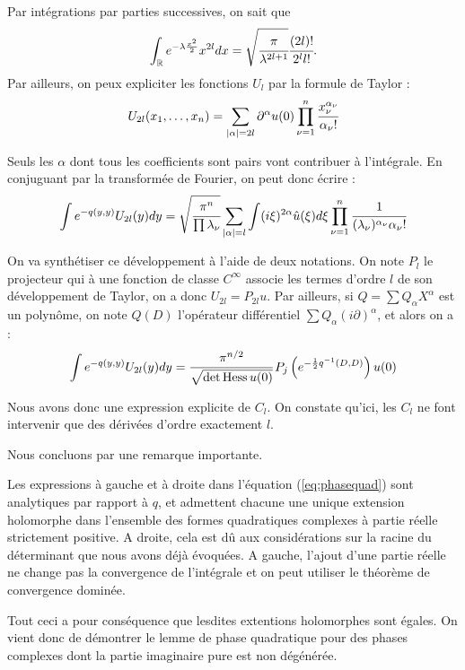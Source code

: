 Par intégrations par parties successives, on sait que 
\begin{equation*}
  \int_{\mathbb{R}} e^{-\lambda \frac{x^2}{2}}x^{2l}dx = \sqrt{\cfrac{\pi}{\lambda^{2l+1}}}\cfrac{(2l)!}{2^l l!}.
\end{equation*}
\noindent Par ailleurs, on peux expliciter les fonctions $U_l$ par la formule de Taylor :
\begin{equation*}
  U_{2l}(x_1,\ldots,x_n) = \sum_{|\alpha|=2l}\partial^{\alpha}u(0)\prod_{\nu=1}^{n}\cfrac{x_{\nu}^{\alpha_{\nu}}}{\alpha_{\nu}!}
\end{equation*}

Seuls les $\alpha$ dont tous les coefficients sont pairs vont contribuer à l'intégrale. En conjuguant par la transformée de Fourier, on peut donc écrire :
\begin{equation*}
  \int e^{-q(y,y)}U_{2l}(y)dy = \sqrt{\cfrac{\pi^n}{\prod \lambda_{\nu}}}\sum_{|\alpha|=l}\int (i\xi)^{2\alpha}\hat{u}(\xi)d\xi \prod_{\nu=1}^{n} \cfrac{1}{(\lambda_{\nu})^{\alpha_{\nu}}\alpha_{\nu}!}
  \end{equation*}
  
On va synthétiser ce développement à l'aide de deux notations. On note $P_l$ le projecteur qui à une fonction de classe $C^{\infty}$ associe les termes d'ordre $l$ de son développement de Taylor, on a donc $U_{2l}=P_{2l}u$. Par ailleurs, si $Q= \sum Q_{\alpha}X^{\alpha}$ est un polynôme, on note $Q(D)$ l'opérateur différentiel $\sum Q_{\alpha}(i\partial)^\alpha$, et alors on a :
\begin{equation*}
\label{eq:phasequad}
  \int e^{-q(y,y)}U_{2l}(y)dy =\cfrac{\pi^{n/2}}{\sqrt{\det \operatorname{Hess} u(0)}}\,P_j\left(e^{-\frac{1}{2}q^{-1}(D,D)}\right)u(0)
  \end{equation*}

\noindent Nous avons donc une expression explicite de $C_l$. On constate qu'ici, les $C_l$ ne font intervenir que des dérivées d'ordre exactement $l$.

Nous concluons par une remarque importante.

\begin{rem}
Les expressions à gauche et à droite dans l'équation (\ref{eq:phasequad}) sont analytiques par rapport à $q$, et admettent chacune une unique extension holomorphe dans l'ensemble des formes quadratiques complexes à partie réelle strictement positive. A droite, cela est dû aux considérations sur la racine du déterminant que nous avons déjà évoquées. A gauche, l'ajout d'une partie réelle ne change pas la convergence de l'intégrale et on peut utiliser le théorème de convergence dominée.

Tout ceci a pour conséquence que lesdites extentions holomorphes sont égales. On vient donc de démontrer le lemme de phase quadratique pour des phases complexes dont la partie imaginaire pure est non dégénérée.
\end{rem}

